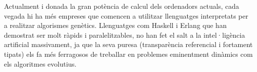 Actualment i donada la gran potència de calcul dels ordenadors actuals, cada
vegada hi ha més empreses que comencen a utilitzar llenguatges interpretats per
a realitzar algorismes genètics. Llenguatges com Haskell i Erlang que han
demostrat ser molt ràpids i paralelitzables, no han fet el salt a la
intel·ligència artificial massivament, ja que la seva puresa (transparència
referencial i fortament tipats) els fa més ferragosos de treballar en problemes
eminentment dinàmics com els algoritmes evolutius.


% 
%


%

